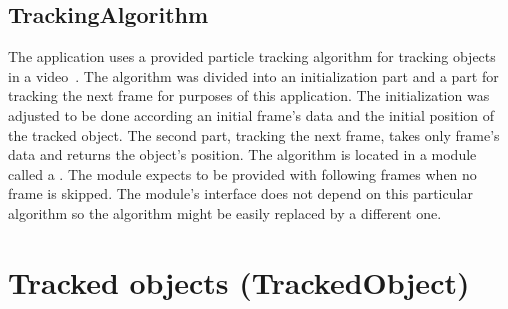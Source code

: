 \subsection{TrackingAlgorithm}
The application uses a provided particle tracking algorithm for tracking objects in a video~\cite{algorithm_thesis}. The algorithm was divided into an initialization part and a part for tracking the next frame for purposes of this application. The initialization was adjusted to be done according an initial frame's data and the initial position of the tracked object. The second part, tracking the next frame, takes only frame's data and returns the object's position. The algorithm is located in a module called a . The module expects to be provided with following frames when no frame is skipped. The module's interface does not depend on this particular algorithm so the algorithm might be easily replaced by a different one.

\section{Tracked objects (TrackedObject)}
